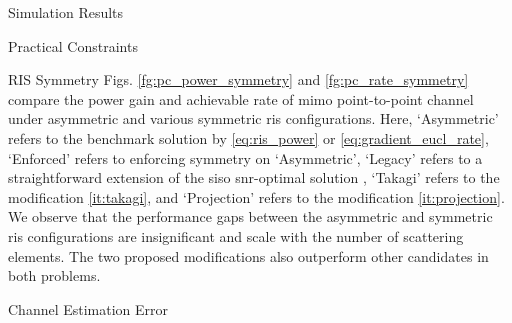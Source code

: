 \documentclass[journal]{IEEEtran}
\begin{document}
\begin{section}{Simulation Results}
\begin{subsection}{Practical Constraints}
\begin{subsubsection}{RIS Symmetry}
			Figs. \ref{fg:pc_power_symmetry} and \ref{fg:pc_rate_symmetry} compare the power gain and achievable rate of \gls{mimo} point-to-point channel under asymmetric and various symmetric \gls{ris} configurations.
			Here, `Asymmetric' refers to the benchmark solution by \eqref{eq:ris_power} or \eqref{eq:gradient_eucl_rate}, `Enforced' refers to enforcing symmetry on `Asymmetric', `Legacy' refers to a straightforward extension of the \gls{siso} \gls{snr}-optimal solution \cite[(6)]{Santamaria2023}, `Takagi' refers to the modification \ref{it:takagi}, and `Projection' refers to the modification \ref{it:projection}.
			We observe that the performance gaps between the asymmetric and symmetric \gls{ris} configurations are insignificant and scale with the number of scattering elements.
			The two proposed modifications also outperform other candidates in both problems.
		\end{subsubsection}

		\begin{subsubsection}{Channel Estimation Error}
			\label{sc:estimation_error}


\end{subsubsection}
\end{subsection}
\end{section}
\end{document}
